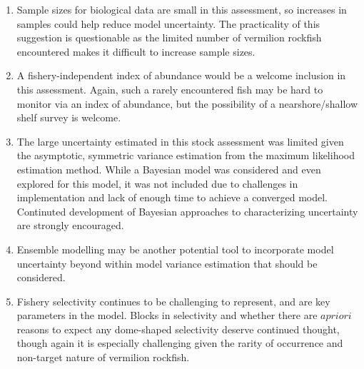\documentclass[11pt,
  english,
  a4paper,
]{article}
\begin{document}
\begin{enumerate}
  \tagmcend\tagstructend\tagstructend
\item

  Sample sizes for biological data are small in this assessment, so increases in samples could help reduce model uncertainty. The practicality of this suggestion is questionable as the limited number of vermilion rockfish encountered makes it difficult to increase sample sizes.

  \tagmcend\tagstructend\tagstructend
\item

  A fishery-independent index of abundance would be a welcome inclusion in this assessment. Again, such a rarely encountered fish may be hard to monitor via an index of abundance, but the possibility of a nearshore/shallow shelf survey is welcome.

  \tagmcend\tagstructend\tagstructend
\item

  The large uncertainty estimated in this stock assessment was limited given the asymptotic, symmetric variance estimation from the maximum likelihood estimation method. While a Bayesian model was considered and even explored for this model, it was not included due to challenges in implementation and lack of enough time to achieve a converged model. Continuted development of Bayesian approaches to characterizing uncertainty are strongly encouraged.

  \tagmcend\tagstructend\tagstructend
\item

  Ensemble modelling may be another potential tool to incorporate model uncertainty beyond within model variance estimation that should be considered.

  \tagmcend\tagstructend\tagstructend
\item

  Fishery selectivity continues to be challenging to represent, and are key parameters in the model. Blocks in selectivity and whether there are {\(a priori\)\leavevmode\tagmcend\tagstructend} reasons to expect any dome-shaped selectivity deserve continued thought, though again it is especially challenging given the rarity of occurrence and non-target nature of vermilion rockfish.

  \tagmcend\tagstructend\tagstructend
\end{enumerate}
\end{document}
